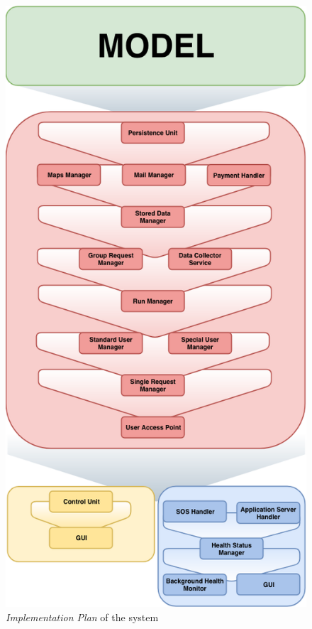 \begin{figure}[H]
  \begin{center}
  	\includegraphics[height=0.59\paperheight]{./img/implementationFlow.png}
    \hspace{0.05\linewidth}
    \centering
    \caption{\textit{Implementation Plan} of the system}
		\label{img:implementationFlow}
    \end{center}
\end{figure}

